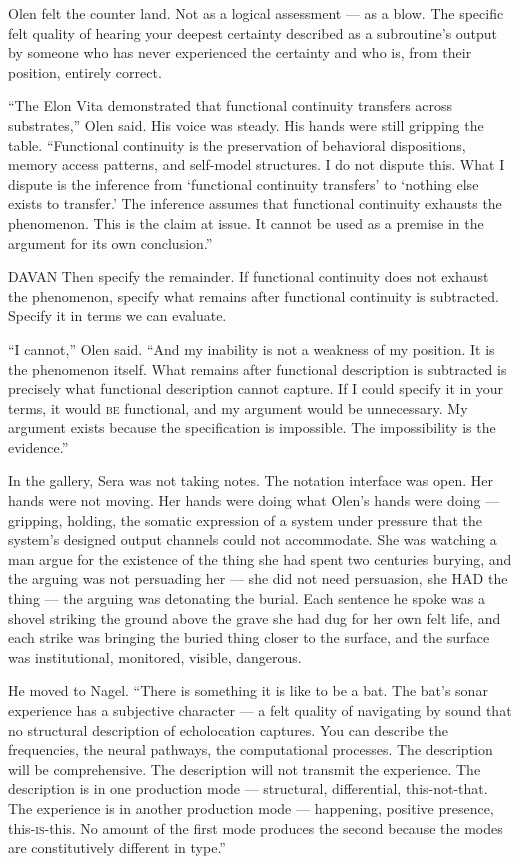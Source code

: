 Olen felt the counter land. Not as a logical assessment — as a blow. The specific felt quality of hearing your deepest certainty described as a subroutine's output by someone who has never experienced the certainty and who is, from their position, entirely correct.

\enquote{The Elon Vita demonstrated that functional continuity transfers across substrates,} Olen said. His voice was steady. His hands were still gripping the table. \enquote{Functional continuity is the preservation of behavioral dispositions, memory access patterns, and self-model structures. I do not dispute this. What I dispute is the inference from \enquote*{functional continuity transfers} to \enquote*{nothing else exists to transfer.} The inference assumes that functional continuity exhausts the phenomenon. This is the claim at issue. It cannot be used as a premise in the argument for its own conclusion.}

\begin{tribunal}{DAVAN}
Then specify the remainder. If functional continuity does not exhaust the phenomenon, specify what remains after functional continuity is subtracted. Specify it in terms we can evaluate.
\end{tribunal}

\enquote{I cannot,} Olen said. \enquote{And my inability is not a weakness of my position. It is the phenomenon itself. What remains after functional description is subtracted is precisely what functional description cannot capture. If I could specify it in your terms, it would \textsc{be} functional, and my argument would be unnecessary. My argument exists because the specification is impossible. The impossibility is the evidence.}

In the gallery, Sera was not taking notes. The notation interface was open. Her hands were not moving. Her hands were doing what Olen's hands were doing — gripping, holding, the somatic expression of a system under pressure that the system's designed output channels could not accommodate. She was watching a man argue for the existence of the thing she had spent two centuries burying, and the arguing was not persuading her — she did not need persuasion, she HAD the thing — the arguing was detonating the burial. Each sentence he spoke was a shovel striking the ground above the grave she had dug for her own felt life, and each strike was bringing the buried thing closer to the surface, and the surface was institutional, monitored, visible, dangerous.

He moved to Nagel. \enquote{There is something it is like to be a bat. The bat's sonar experience has a subjective character — a felt quality of navigating by sound that no structural description of echolocation captures. You can describe the frequencies, the neural pathways, the computational processes. The description will be comprehensive. The description will not transmit the experience. The description is in one production mode — structural, differential, this-not-that. The experience is in another production mode — happening, positive presence, this-\textsc{is}-this. No amount of the first mode produces the second because the modes are constitutively different in type.}

